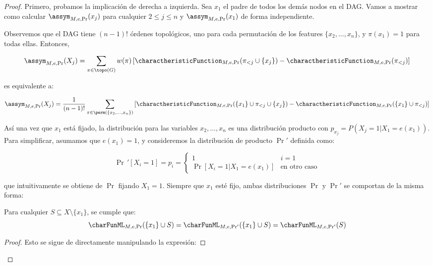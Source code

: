 \begin{proof}
Primero, probamos la implicación de derecha a izquierda. Sea \(x_1\) el padre de todos los demás nodos en el DAG. Vamos a mostrar como calcular \(\assym_{M,e,\Pr}(x_j)\) para cualquier \(2 \leq j \leq n\) y \(\assym_{M,e,\Pr}(x_1)\) de forma independiente.

Observemos que el DAG tiene \((n-1)!\) órdenes topológicos, uno para cada permutación de los features \(\{x_2, \ldots, x_n\}\), y \(\pi(x_1) = 1\) para todas ellas. Entonces,

\[\label{eq:assymetric_for_naive_child}
\assym_{M,e,\Pr}(X_j) = \sum_{\pi \in \topo(G)} w(\pi) \left[ \charactheristicFunction_{M,e,\Pr}(\pi_{<j} \cup \{x_j\}) 
- \charactheristicFunction_{M,e,\Pr}(\pi_{<j}) \right]
\]

es equivalente a:

\[
\assym_{M,e,\Pr}(X_j) = \frac{1}{(n-1)!} \sum_{\pi \in \perm(\{x_2, \ldots, x_n\})} \left[ \charactheristicFunction_{M,e,\Pr}(\{x_1\} \cup \pi_{<j} \cup \{x_j\}) - \charactheristicFunction_{M,e,\Pr}(\{x_1\} \cup \pi_{<j}) \right]
\]

Así una vez que \(x_1\) está fijado, la distribución para las variables \(x_2, \ldots, x_n\) es una distribución producto con \(p_{x_j} = P(X_j = 1 | X_1 = e(x_1))\). Para simplificar, asumamos que \(e(x_1) = 1\), y consideremos la distribución de producto \(\Pr'\) definida como:

\[
\Pr\,'[X_i = 1] = p_i = 
\begin{cases}
1 & i = 1 \\
\Pr[X_i = 1 | X_1 = e(x_1)] & \text{en otro caso}
\end{cases}
\]

que intuitivamente se obtiene de \(\Pr\) fijando \(X_1 = 1\). Siempre que \(x_1\) esté fijo, ambas distribuciones \(\Pr\) y \(\Pr'\) se comportan de la misma forma:


\begin{lemma}\label{lemma:valuation_of_prob_function}
Para cualquier \(S \subseteq X \setminus \{x_1\}\), se cumple que:
\[
\charFunML_{M,e,\Pr}(\{x_1\} \cup S) = \charFunML_{M,e,\Pr'}(\{x_1\} \cup S) = \charFunML_{M,e,\Pr'}(S)
\]
\end{lemma}

\begin{proof}
Esto se sigue de directamente manipulando la expresión:
    

\end{proof}
\end{proof}
